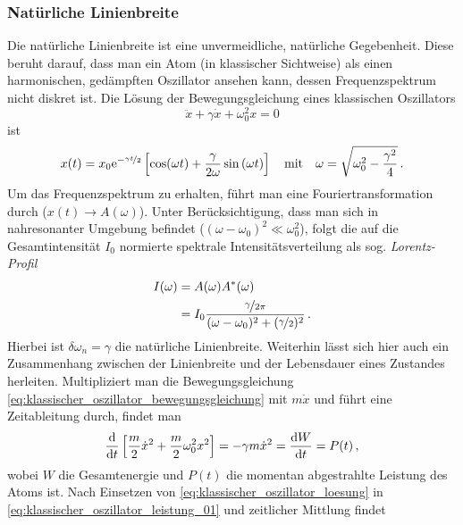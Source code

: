 \subsubsection{Natürliche
Linienbreite}\label{subsubsec:natuerliche_linienbreite}
Die natürliche Linienbreite ist eine unvermeidliche, natürliche Gegebenheit.
Diese beruht darauf, dass man ein Atom (in klassischer Sichtweise) als
einen harmonischen, gedämpften Oszillator ansehen kann, dessen Frequenzspektrum
nicht diskret ist. Die Lösung der Bewegungsgleichung eines klassischen
Oszillators
\begin{equation}\label{eq:klassischer_oszillator_bewegungsgleichung}
	\ddot x+\gamma\dot x+\omega_0^2x=0
\end{equation}
ist
\begin{equation}\label{eq:klassischer_oszillator_loesung}
	x(t)=x_0\mathrm{e}^{-\nicefrac{\gamma t}{2}}\left[\cos(\omega
	t)+\frac{\gamma}{2\omega}\sin{(\omega t)}\right]\quad
	\text{mit}\quad \omega=\sqrt{\omega_0^2-\frac{\gamma^2}{4}}\,.
\end{equation}
Um das Frequenzspektrum zu erhalten, führt man eine Fouriertransformation durch
($x(t)\to A(\omega)$). Unter Berücksichtigung, dass man sich in nahresonanter
Umgebung befindet ($(\omega-\omega_0)^2\ll\omega_0^2$), folgt die auf die
Gesamtintensität $I_0$ normierte spektrale Intensitätsverteilung als sog.
\textit{Lorentz-Profil}
\begin{equation}\label{eq:lorentz-profil}
	\begin{split}
		I(\omega) &=A(\omega)A^*(\omega)\\
		&=
		I_0\frac{\nicefrac{\gamma}{2\pi}}{(\omega-\omega_0)^2+(\nicefrac{\gamma}{2})^2}\,.
	\end{split}
\end{equation}
Hierbei ist $\delta\omega_n=\gamma$ die natürliche Linienbreite. Weiterhin lässt
sich hier auch ein Zusammenhang zwischen der Linienbreite und der Lebensdauer
eines Zustandes herleiten. Multipliziert man die Bewegungsgleichung
\eqref{eq:klassischer_oszillator_bewegungsgleichung} mit $m\dot x$ und führt
eine Zeitableitung durch, findet man
\begin{equation}\label{eq:klassischer_oszillator_leistung_01}
	\frac{\mathrm{d} }{\mathrm{d} t}\left[\frac{m}{2}\dot
	x^2+\frac{m}{2}\omega_0^2x^2\right]=-\gamma m\dot x^2=\frac{\mathrm{d} W}{\mathrm{d} t}=P(t)\,,
\end{equation}
wobei $W$ die Gesamtenergie und $P(t)$ die momentan abgestrahlte Leistung des
Atoms ist. Nach Einsetzen von \eqref{eq:klassischer_oszillator_loesung} in
\eqref{eq:klassischer_oszillator_leistung_01} und zeitlicher Mittlung findet
